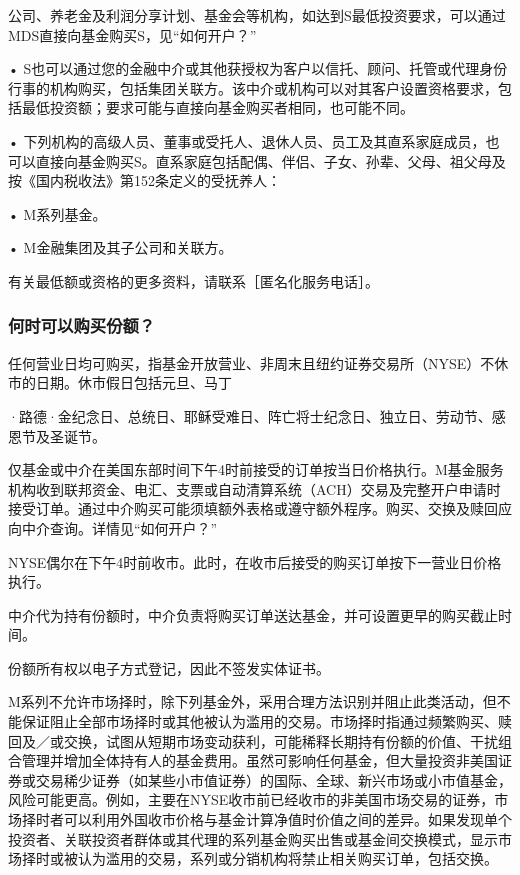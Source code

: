 \documentclass[UTF8,fontset=none,11pt,a4paper]{ctexart}
\begin{document}
公司、养老金及利润分享计划、基金会等机构，如达到S最低投资要求，可以通过MDS直接向基金购买S，见“如何开户？”

\noindent • S也可以通过您的金融中介或其他获授权为客户以信托、顾问、托管或代理身份行事的机构购买，包括集团关联方。该中介或机构可以对其客户设置资格要求，包括最低投资额；要求可能与直接向基金购买者相同，也可能不同。\par\smallskip
\noindent • 下列机构的高级人员、董事或受托人、退休人员、员工及其直系家庭成员，也可以直接向基金购买S。直系家庭包括配偶、伴侣、子女、孙辈、父母、祖父母及按《国内税收法》第152条定义的受抚养人：\par\smallskip
\noindent • M系列基金。\par\smallskip
\noindent • M金融集团及其子公司和关联方。\par\smallskip
有关最低额或资格的更多资料，请联系［匿名化服务电话］。

\subsubsection*{何时可以购买份额？}
任何营业日均可购买，指基金开放营业、非周末且纽约证券交易所（NYSE）不休市的日期。休市假日包括元旦、马丁

·路德·金纪念日、总统日、耶稣受难日、阵亡将士纪念日、独立日、劳动节、感恩节及圣诞节。

仅基金或中介在美国东部时间下午4时前接受的订单按当日价格执行。M基金服务机构收到联邦资金、电汇、支票或自动清算系统（ACH）交易及完整开户申请时接受订单。通过中介购买可能须填额外表格或遵守额外程序。购买、交换及赎回应向中介查询。详情见“如何开户？”

NYSE偶尔在下午4时前收市。此时，在收市后接受的购买订单按下一营业日价格执行。

中介代为持有份额时，中介负责将购买订单送达基金，并可设置更早的购买截止时间。

份额所有权以电子方式登记，因此不签发实体证书。

M系列不允许市场择时，除下列基金外，采用合理方法识别并阻止此类活动，但不能保证阻止全部市场择时或其他被认为滥用的交易。市场择时指通过频繁购买、赎回及／或交换，试图从短期市场变动获利，可能稀释长期持有份额的价值、干扰组合管理并增加全体持有人的基金费用。虽然可影响任何基金，但大量投资非美国证券或交易稀少证券（如某些小市值证券）的国际、全球、新兴市场或小市值基金，风险可能更高。例如，主要在NYSE收市前已经收市的非美国市场交易的证券，市场择时者可以利用外国收市价格与基金计算净值时价值之间的差异。如果发现单个投资者、关联投资者群体或其代理的系列基金购买出售或基金间交换模式，显示市场择时或被认为滥用的交易，系列或分销机构将禁止相关购买订单，包括交换。
\end{document}
